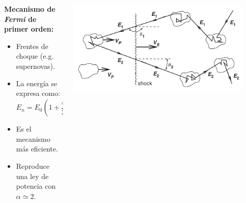     \begin{frame}{} %
        \justifying %

        \begin{columns}
            \begin{column}{0.45\textwidth} %
            		\textbf{\small Mecanismo de \emph{Fermi} de primer orden:}
                \begin{itemize}
                    \item Frentes de choque (e.g. supernovas).
                    \item La energía se expresa como: \[E_{n} = E_{0} \left(1 + \frac{4}{3} \beta\right)^{n}\]
                    \item Es el mecanismo más eficiente.
                    \item Reproduce una ley de potencia con $\alpha \simeq 2$.
                \end{itemize}
            \end{column}

            \begin{column}{0.4\textwidth} %
                \includegraphics[width=0.9\textwidth]{Figures/fermifirstorder.png}
            \end{column}
        \end{columns}
    \end{frame}